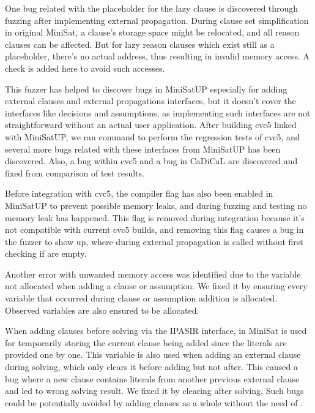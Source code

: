 One bug related with the placeholder for the lazy clause is discovered through fuzzing after implementing external propagation. During clause set simplification in original MiniSat, a clause's storage space might be relocated, and all reason clauses can be affected. But for lazy reason clauses which exist still as a placeholder, there's no actual address, thus resulting in invalid memory access. A check is added here to avoid such accesses.

This fuzzer has helped to discover bugs in MiniSatUP especially for adding external clauses and external propagations interfaces, but it doesn't cover the interfaces like decisions and assumptions, as implementing such interfaces are not straightforward without an actual user application. After building cvc5 linked with MiniSatUP, we ran  command to perform the regression tests of cvc5, and several more bugs related with these interfaces from MiniSatUP has been discovered. Also, a bug within cvc5 and a bug in CaDiCaL are discovered and fixed from comparison of test results.

Before integration with cvc5, the compiler flag  has also been enabled in MiniSatUP to prevent possible memory leaks, and during fuzzing and testing no memory leak has happened. This flag is removed during integration because it's not compatible with current cvc5 builds, and removing this flag causes a bug in the fuzzer to show up, where during external propagation  is called without first checking if  are empty.

Another error with unwanted memory access was identified due to the variable not allocated when adding a clause or assumption. We fixed it by ensuring every variable that occurred during clause or assumption addition is allocated. Observed variables are also ensured to be allocated.

When adding clauses before solving via the IPASIR interface,  in MiniSat is used for temporarily storing the current clause being added since the literals are provided one by one. This variable is also used when adding an external clause during solving, which only clears it before adding but not after. This caused a bug where a new clause contains literals from another previous external clause and led to wrong solving result. We fixed it by clearing  after solving. Such bugs could be potentially avoided by adding clauses as a whole without the need of .

